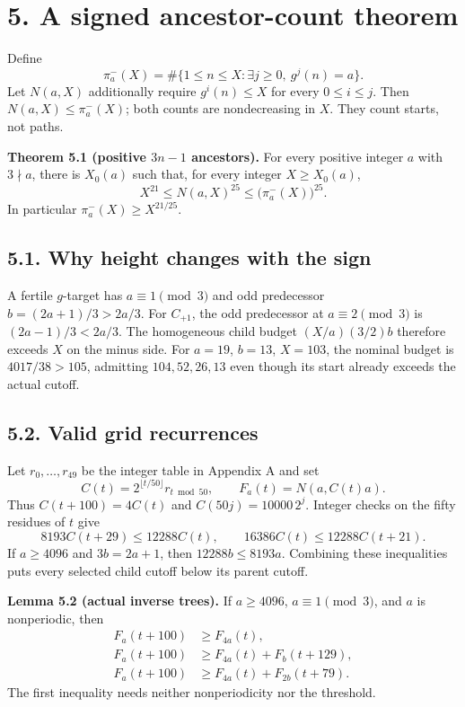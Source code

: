 \documentclass[11pt,a4paper]{article}
\begin{document}
\section{5. A signed ancestor-count
theorem}\label{a-signed-ancestor-count-theorem}

Define \[
\pi^-_a(X)=\#\{1\le n\le X:\exists j\ge0,\ g^j(n)=a\}.
\] Let \(N(a,X)\) additionally require \(g^i(n)\le X\) for every
\(0\le i\le j\). Then \(N(a,X)\le\pi^-_a(X)\); both counts are
nondecreasing in \(X\). They count starts, not paths.

\textbf{Theorem 5.1 (positive \(3n-1\) ancestors).} For every positive
integer \(a\) with \(3\nmid a\), there is \(X_0(a)\) such that, for
every integer \(X\ge X_0(a)\), \[
X^{21}\le N(a,X)^{25}\le\bigl(\pi^-_a(X)\bigr)^{25}.
\tag{5.1}
\] In particular \(\pi^-_a(X)\ge X^{21/25}\).

\subsection{5.1. Why height changes with the
sign}\label{why-height-changes-with-the-sign}

A fertile \(g\)-target has \(a\equiv1\pmod3\) and odd predecessor
\(b=(2a+1)/3>2a/3\). For \(C_{+1}\), the odd predecessor at
\(a\equiv2\pmod3\) is \((2a-1)/3<2a/3\). The homogeneous child budget
\((X/a)(3/2)b\) therefore exceeds \(X\) on the minus side. For \(a=19\),
\(b=13\), \(X=103\), the nominal budget is \(4017/38>105\), admitting
\(104,52,26,13\) even though its start already exceeds the actual
cutoff.

\subsection{5.2. Valid grid recurrences}\label{valid-grid-recurrences}

Let \(r_0,\ldots,r_{49}\) be the integer table in Appendix A and set \[
C(t)=2^{\lfloor t/50\rfloor}r_{t\bmod50},\qquad
F_a(t)=N(a,C(t)a).
\] Thus \(C(t+100)=4C(t)\) and \(C(50j)=10000\,2^j\). Integer checks on
the fifty residues of \(t\) give \[
8193C(t+29)\le12288C(t),\qquad
16386C(t)\le12288C(t+21).
\tag{5.2}
\] If \(a\ge4096\) and \(3b=2a+1\), then \(12288b\le8193a\). Combining
these inequalities puts every selected child cutoff below its parent
cutoff.

\textbf{Lemma 5.2 (actual inverse trees).} If \(a\ge4096\),
\(a\equiv1\pmod3\), and \(a\) is nonperiodic, then \[
\begin{aligned}
F_a(t+100)&\ge F_{4a}(t),\\
F_a(t+100)&\ge F_{4a}(t)+F_b(t+129),\\
F_a(t+100)&\ge F_{4a}(t)+F_{2b}(t+79).
\end{aligned}
\tag{5.3}
\] The first inequality needs neither nonperiodicity nor the threshold.
\end{document}
